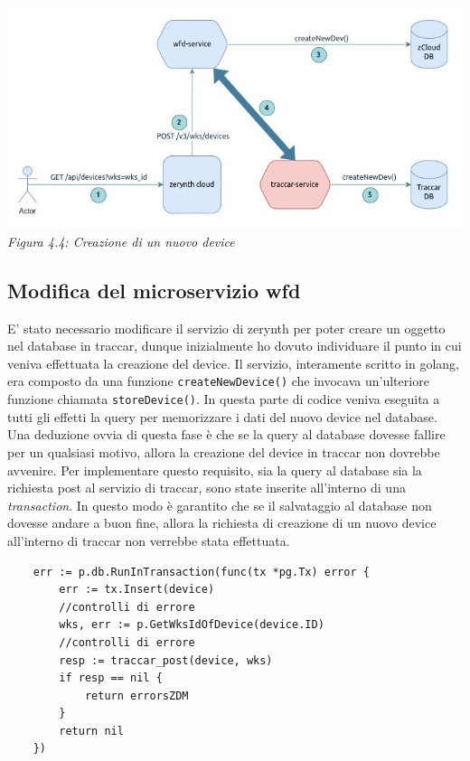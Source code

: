 \documentclass[a4paper,titlepage,12pt]{book}
\begin{document}
{\begin{center}
\includegraphics[scale=0.6]{images/dev_create.jpg}\\ 
\textit{Figura 4.4: Creazione di un nuovo device}
\end{center}

\subsection{
Modifica del microservizio wfd}
E' stato necessario modificare il servizio di zerynth per poter creare un oggetto nel database in traccar, dunque inizialmente ho dovuto individuare il punto in cui veniva effettuata la creazione del device. Il servizio, interamente scritto in golang, era composto da una funzione \texttt{createNewDevice()} che invocava un'ulteriore funzione chiamata \texttt{storeDevice()}. In questa parte di codice veniva eseguita a tutti gli effetti la query per memorizzare i dati del nuovo device nel database.\\
Una deduzione ovvia di questa fase è che se la query al database dovesse fallire per un qualsiasi motivo, allora la creazione del device in traccar non dovrebbe avvenire. Per implementare questo requisito, sia la query al database sia la richiesta post al servizio di traccar, sono state inserite all'interno di una \textit{transaction}. In questo modo è garantito che se il salvataggio al database non dovesse andare a buon fine, allora la richiesta di creazione di un nuovo device all'interno di traccar non verrebbe stata effettuata.
\newpage
\begin{verbatim}
	err := p.db.RunInTransaction(func(tx *pg.Tx) error {
		err := tx.Insert(device) 
		//controlli di errore
		wks, err := p.GetWksIdOfDevice(device.ID)
		//controlli di errore
		resp := traccar_post(device, wks)
		if resp == nil {
			return errorsZDM
		}
		return nil
	})


\end{verbatim}


}
\end{document}
